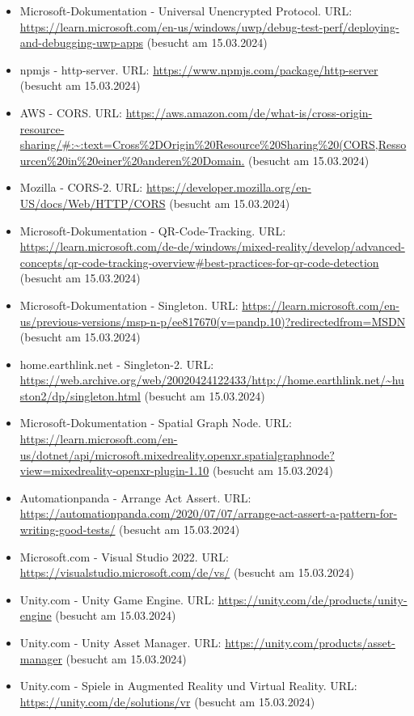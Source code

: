 \begin{itemize}
    \item Microsoft-Dokumentation - Universal Unencrypted Protocol. URL: \url{https://learn.microsoft.com/en-us/windows/uwp/debug-test-perf/deploying-and-debugging-uwp-apps} (besucht am 15.03.2024)
    \item npmjs - http-server. URL: \url{https://www.npmjs.com/package/http-server} (besucht am 15.03.2024)
    \item AWS - CORS. URL: \url{https://aws.amazon.com/de/what-is/cross-origin-resource-sharing/#:~:text=Cross%2DOrigin%20Resource%20Sharing%20(CORS,Ressourcen%20in%20einer%20anderen%20Domain.} (besucht am 15.03.2024)
    \item Mozilla - CORS-2. URL: \url{https://developer.mozilla.org/en-US/docs/Web/HTTP/CORS} (besucht am 15.03.2024)
    \item Microsoft-Dokumentation - QR-Code-Tracking. URL: \url{https://learn.microsoft.com/de-de/windows/mixed-reality/develop/advanced-concepts/qr-code-tracking-overview#best-practices-for-qr-code-detection} (besucht am 15.03.2024)
    \item Microsoft-Dokumentation - Singleton. URL: \url{https://learn.microsoft.com/en-us/previous-versions/msp-n-p/ee817670(v=pandp.10)?redirectedfrom=MSDN} (besucht am 15.03.2024)
    \item home.earthlink.net - Singleton-2. URL: \url{https://web.archive.org/web/20020424122433/http://home.earthlink.net/~huston2/dp/singleton.html} (besucht am 15.03.2024)
    \item Microsoft-Dokumentation - Spatial Graph Node. URL: \url{https://learn.microsoft.com/en-us/dotnet/api/microsoft.mixedreality.openxr.spatialgraphnode?view=mixedreality-openxr-plugin-1.10} (besucht am 15.03.2024)
    \item Automationpanda - Arrange Act Assert. URL: \url{https://automationpanda.com/2020/07/07/arrange-act-assert-a-pattern-for-writing-good-tests/} (besucht am 15.03.2024)
    \item Microsoft.com - Visual Studio 2022. URL: \url{https://visualstudio.microsoft.com/de/vs/} (besucht am 15.03.2024)
    \item Unity.com - Unity Game Engine. URL: \url{https://unity.com/de/products/unity-engine} (besucht am 15.03.2024)
    \item Unity.com - Unity Asset Manager. URL: \url{https://unity.com/products/asset-manager} (besucht am 15.03.2024)
    \item Unity.com - Spiele in Augmented Reality und Virtual Reality. URL: \url{https://unity.com/de/solutions/vr} (besucht am 15.03.2024)

\end{itemize}
